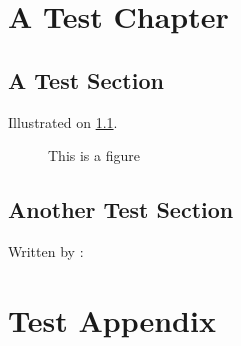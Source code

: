 \newcommand{\thetitle}{The Great Project\\ And How to Typeset it}
\newcommand{\thegroup}{Group XXXX}
\newcommand{\theauthors}{
	Anders Andersen\\
	Anders Andersen\\
	Anders Andersen\\
	Anders Andersen
}
\newcommand{\thesupervisor}{Your Supervisor}
\newcommand{\thestudy}{Your Study}
\newcommand{\thetheme}{Your Theme}
\newcommand{\theprojectperiod}{Spring / Summer}
\newcommand{\deadline}{\today}





\chapter{A Test Chapter}
\lipsum[1]

\section{A Test Section}
\lipsum[2] \autocite{goossens93}

\lipsum[3] Illustrated on \cref{fig:themissingfigure}.
\begin{figure}[h]
	\centering
	\caption{This is a figure}
	\label{fig:themissingfigure}
\end{figure}

\section{Another Test Section}
\lipsum[4]

Written by \textcite{greenwade93}:
\lipsum[5] 

\printbibliography[
	heading=bibintoc         %
	,title={Litteraturliste}%
]

\listoffigures

\appendix
\chapter{Test Appendix}
\lipsum[1]

